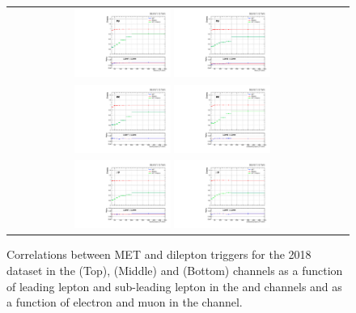 \begin{figure}[htb]
  \begin{center}
    \begin{tabular}{cc}
      \includegraphics[width=0.30\textwidth]{fig_2018_TrigSF/g_lepApt_emu_alpha.pdf}
      \includegraphics[width=0.30\textwidth]{fig_2018_TrigSF/g_lepBpt_emu_alpha.pdf}\\
      \includegraphics[width=0.30\textwidth]{fig_2018_TrigSF/g_lepApt_ee_alpha.pdf}
      \includegraphics[width=0.30\textwidth]{fig_2018_TrigSF/g_lepBpt_ee_alpha.pdf}\\
      \includegraphics[width=0.30\textwidth]{fig_2018_TrigSF/g_lepApt_mumu_alpha.pdf}
      \includegraphics[width=0.30\textwidth]{fig_2018_TrigSF/g_lepBpt_mumu_alpha.pdf}\\
    \end{tabular}
    \caption{Correlations between MET and dilepton triggers for the 2018 dataset in the \emu (Top), \ee (Middle) and \mumu (Bottom) channels as a function of leading lepton \pT and sub-leading lepton \pT in the \ee and \mumu channels and as a function of electron \pT and muon \pT in the \emu channel.}
    \label{TrigSF_2018_5}
  \end{center}
\end{figure}


